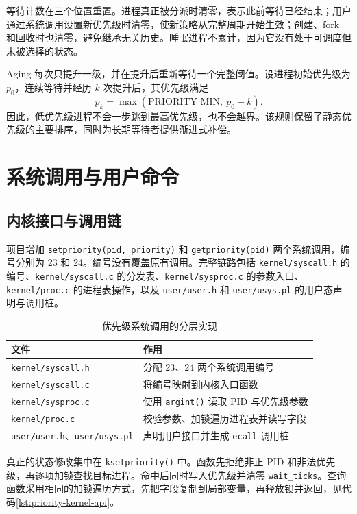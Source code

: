 等待计数在三个位置重置。进程真正被分派时清零，表示此前等待已经结束；用户通过系统调用设置新优先级时清零，使新策略从完整周期开始生效；创建、fork 和回收时也清零，避免继承无关历史。睡眠进程不累计，因为它没有处于可调度但未被选择的状态。

Aging 每次只提升一级，并在提升后重新等待一个完整阈值。设进程初始优先级为 $p_0$，连续等待并经历 $k$ 次提升后，其优先级满足
\[
  p_k=\max(\mathrm{PRIORITY\_MIN},\ p_0-k).
\]
因此，低优先级进程不会一步跳到最高优先级，也不会越界。该规则保留了静态优先级的主要排序，同时为长期等待者提供渐进式补偿。

\section{系统调用与用户命令}

\subsection{内核接口与调用链}

项目增加 \texttt{setpriority(pid, priority)} 和 \texttt{getpriority(pid)} 两个系统调用，编号分别为 23 和 24。编号没有覆盖原有调用。完整链路包括 \texttt{kernel/syscall.h} 的编号、\texttt{kernel/syscall.c} 的分发表、\texttt{kernel/sysproc.c} 的参数入口、\texttt{kernel/proc.c} 的进程表操作，以及 \texttt{user/user.h} 和 \texttt{user/usys.pl} 的用户态声明与调用桩。

\begin{table}[htbp]
  \centering
  \small
  \caption{优先级系统调用的分层实现}
  \label{tab:syscall-chain}
  \begin{tabularx}{\textwidth}{C{3.4cm}X}
    \toprule
    文件 & 作用 \\
    \midrule
    \texttt{kernel/syscall.h} & 分配 23、24 两个系统调用编号 \\
    \texttt{kernel/syscall.c} & 将编号映射到内核入口函数 \\
    \texttt{kernel/sysproc.c} & 使用 \texttt{argint()} 读取 PID 与优先级参数 \\
    \texttt{kernel/proc.c} & 校验参数、加锁遍历进程表并读写字段 \\
    \texttt{user/user.h}、\texttt{user/usys.pl} & 声明用户接口并生成 \texttt{ecall} 调用桩 \\
    \bottomrule
  \end{tabularx}
\end{table}

真正的状态修改集中在 \texttt{ksetpriority()} 中。函数先拒绝非正 PID 和非法优先级，再逐项加锁查找目标进程。命中后同时写入优先级并清零 \texttt{wait\_ticks}。查询函数采用相同的加锁遍历方式，先把字段复制到局部变量，再释放锁并返回，见代码\ref{lst:priority-kernel-api}。

